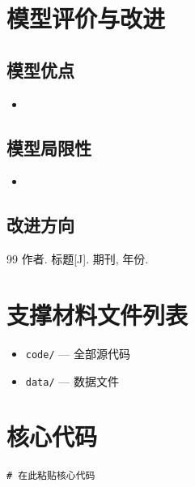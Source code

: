 \documentclass[12pt, a4paper]{article}
\begin{document}
\section{模型评价与改进}

\subsection{模型优点}
\begin{itemize}
    \item 
\end{itemize}

\subsection{模型局限性}
\begin{itemize}
    \item 
\end{itemize}

\subsection{改进方向}

\begin{thebibliography}{99}
 作者. 标题[J]. 期刊, 年份.
\end{thebibliography}

\appendix
\section{支撑材料文件列表}
\begin{itemize}
    \item \texttt{code/} — 全部源代码
    \item \texttt{data/} — 数据文件
\end{itemize}

\section{核心代码}
\begin{lstlisting}
# 在此粘贴核心代码
\end{lstlisting}
\end{document}
